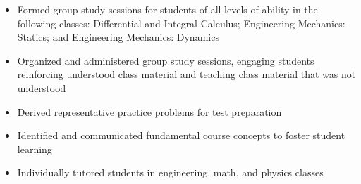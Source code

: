 \documentclass[10pt,a4paper]{article}
\begin{document}
\begin{itemize}
  \item Formed group study sessions for students of all levels of ability in the
    following classes: Differential and Integral Calculus; Engineering Mechanics:
    Statics; and Engineering Mechanics: Dynamics
  \item Organized and administered group study sessions, engaging students reinforcing
    understood class material and teaching class material that was not understood
  \item Derived representative practice problems for test preparation
  \item Identified and communicated fundamental course concepts to foster student
    learning
  \item Individually tutored students in engineering, math, and physics classes
\end{itemize}
\end{document}
